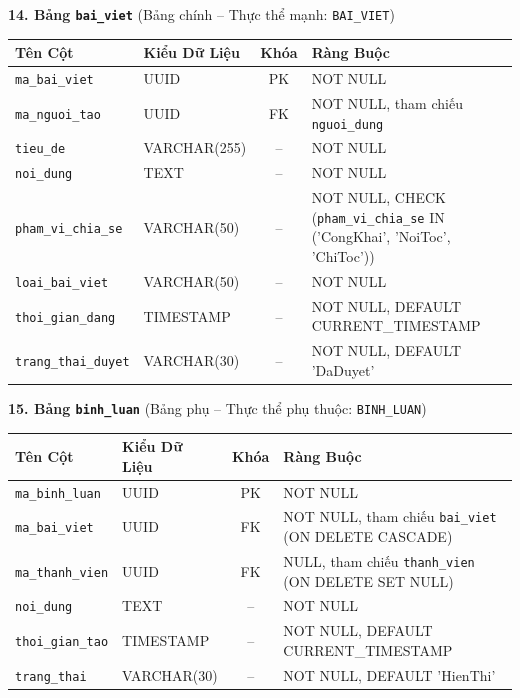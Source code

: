 \noindent\textbf{14. Bảng \texttt{bai\_viet}} \quad (Bảng chính -- Thực thể mạnh: \texttt{BAI\_VIET})
\vspace{0.2cm}

\begin{center}
\small
\renewcommand{\arraystretch}{1.2}
\begin{tabular}{|p{3.8cm}|p{2.5cm}|c|p{6.5cm}|}
\hline
\textbf{Tên Cột} & \textbf{Kiểu Dữ Liệu} & \textbf{Khóa} & \textbf{Ràng Buộc} \\ \hline
\texttt{ma\_bai\_viet} & UUID & PK & NOT NULL \\ \hline
\texttt{ma\_nguoi\_tao} & UUID & FK & NOT NULL, tham chiếu \texttt{nguoi\_dung} \\ \hline
\texttt{tieu\_de} & VARCHAR(255) & -- & NOT NULL \\ \hline
\texttt{noi\_dung} & TEXT & -- & NOT NULL \\ \hline
\texttt{pham\_vi\_chia\_se} & VARCHAR(50) & -- & NOT NULL, CHECK (\texttt{pham\_vi\_chia\_se} IN ('CongKhai', 'NoiToc', 'ChiToc')) \\ \hline
\texttt{loai\_bai\_viet} & VARCHAR(50) & -- & NOT NULL \\ \hline
\texttt{thoi\_gian\_dang} & TIMESTAMP & -- & NOT NULL, DEFAULT CURRENT\_TIMESTAMP \\ \hline
\texttt{trang\_thai\_duyet} & VARCHAR(30) & -- & NOT NULL, DEFAULT 'DaDuyet' \\ \hline
\end{tabular}
\end{center}
\vspace{0.3cm}

\noindent\textbf{15. Bảng \texttt{binh\_luan}} \quad (Bảng phụ -- Thực thể phụ thuộc: \texttt{BINH\_LUAN})
\vspace{0.2cm}

\begin{center}
\small
\renewcommand{\arraystretch}{1.2}
\begin{tabular}{|p{3.8cm}|p{2.5cm}|c|p{6.5cm}|}
\hline
\textbf{Tên Cột} & \textbf{Kiểu Dữ Liệu} & \textbf{Khóa} & \textbf{Ràng Buộc} \\ \hline
\texttt{ma\_binh\_luan} & UUID & PK & NOT NULL \\ \hline
\texttt{ma\_bai\_viet} & UUID & FK & NOT NULL, tham chiếu \texttt{bai\_viet} (ON DELETE CASCADE) \\ \hline
\texttt{ma\_thanh\_vien} & UUID & FK & NULL, tham chiếu \texttt{thanh\_vien} (ON DELETE SET NULL) \\ \hline
\texttt{noi\_dung} & TEXT & -- & NOT NULL \\ \hline
\texttt{thoi\_gian\_tao} & TIMESTAMP & -- & NOT NULL, DEFAULT CURRENT\_TIMESTAMP \\ \hline
\texttt{trang\_thai} & VARCHAR(30) & -- & NOT NULL, DEFAULT 'HienThi' \\ \hline
\end{tabular}
\end{center}
\vspace{0.3cm}

